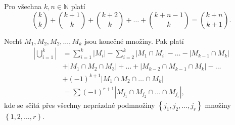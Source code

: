 \begin{veta}
    Pro všechna $k,n \in \mathbb N$ platí
    $$\binom{k}{k} + \binom{k+1}{k}+\binom{k+2}{k}+\dots + \binom{k+n-1}{k}=
    \binom{k+n}{k+1}.$$
\end{veta}

\begin{veta}
    Nechť $M_1, M_2, M_2, \dots, M_k$ jsou konečné množiny. Pak platí
    \begin{align*}
        \left | \bigcup_{i=1}^k  \right | &= \sum_{i=1}^k \left | M_i \right |
        - \sum_{i=2}^k \left | M_1 \cap M_i \right | - \dots
        - \left | M_{k-1}\cap M_k \right | \\
        &+ \left | M_1\cap M_2 \cap M_3 \right | + \dots +
        \left | M_{k-2}\cap M_{k-1} \cap M_k \right | - \dots \\
        & + (-1)^{k+1} \left | M_1\cap M_2 \cap \dots \cap M_k \right |\\
        &= \sum (-1)^{r+1} \left | M_{j_1}\cap M_{j_2} \cap \dots \cap M_{j_r} \right |,
    \end{align*}
    kde se sčítá přes všechny neprázdné podmnožiny $\left \{ j_1, j_2, \dots,
   j_r \right \} $ množiny $\left \{ 1,2,\dots, r \right \}$.
\end{veta}
